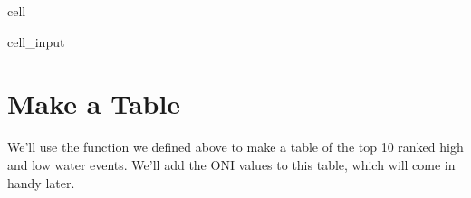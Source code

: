 \documentclass[letterpaper,10pt,english]{jupyterBook}
\begin{document}
\begin{sphinxuseclass}{cell}
\begin{sphinxVerbatimInput}
\begin{sphinxuseclass}{cell_input}
\begin{sphinxVerbatim}[commandchars=\\\{\}]
    \PYG{p}{[}\PYG{p}{]}  \PYG{p}{[}\PYG{p}{]}

     
\end{sphinxVerbatim}

\end{sphinxuseclass}\end{sphinxVerbatimInput}

\end{sphinxuseclass}

\chapter{Make a Table}
\label{\detokenize{notebooks/regional_and_local/SL_Rankings_annual:make-a-table}}
\sphinxAtStartPar
We’ll use the function we defined above to make a table of the top 10 ranked high and low water events. We’ll add the ONI values to this table, which will come in handy later.
\end{document}
